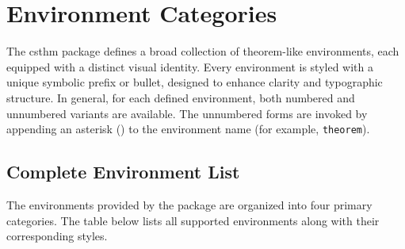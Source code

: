 \documentclass[10pt,letterpaper]{amsart}
\begin{document}
\section{Environment Categories}

The \textsf{csthm} package defines a broad collection of theorem-like
environments, each equipped with a distinct visual identity. Every environment
is styled with a unique symbolic prefix or bullet, designed to enhance clarity
and typographic structure. In general, for each defined environment, both
numbered and unnumbered variants are available. The unnumbered forms are
invoked by appending an asterisk (\texttt{\ast}) to the environment name (for
example, \texttt{theorem}).

\subsection{Complete Environment List}

The environments provided by the package are organized into four primary
categories. The table below lists all supported environments along with their
corresponding styles.
\end{document}
